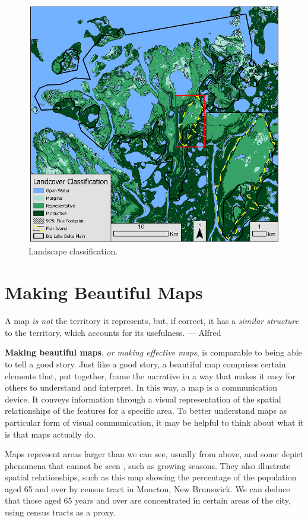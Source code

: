 \documentclass[
]{book}
\begin{document}
\begin{figure}
\includegraphics[width=1\linewidth]{images/16-fig6} \caption{Landscape classification.}\label{fig:16-fig6}
\end{figure}

\hypertarget{making-beautiful-maps}{%
\chapter{Making Beautiful Maps}\label{making-beautiful-maps}}

A map \emph{is not} the territory it represents, but, if correct, it has a \emph{similar structure} to the territory, which accounts for its usefulness.
--- Alfred \citet{korzybski_science_1933}

\textbf{Making beautiful maps}, \emph{or making effective maps}, is comparable to being able to tell a good story. Just like a good story, a beautiful map comprises certain elements that, put together, frame the narrative in a way that makes it easy for others to understand and interpret. In this way, a map is a communication device. It conveys information through a visual representation of the spatial relationships of the features for a specific area. To better understand maps as particular form of visual communication, it may be helpful to think about what it is that maps actually do.

Maps represent areas larger than we can see, usually from above, and some depict phenomena that cannot be seen \citep{manson_maps_2017}, such as growing seasons. They also illustrate spatial relationships, such as this map showing the percentage of the population aged 65 and over by census tract in Moncton, New Brunswick. We can deduce that those aged 65 years and over are concentrated in certain areas of the city, using census tracts as a proxy.
\end{document}
